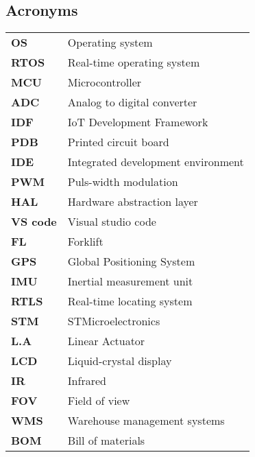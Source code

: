 \documentclass[../report.tex]{subfiles}
\begin{document}
\subsection{Acronyms}
\begin{table}[H]
    \begin{center}
        \begin{tabularx}{\linewidth}{l L}
            \textbf{OS} & Operating system\\
            \textbf{RTOS} & Real-time operating system\\
            \textbf{MCU} & Microcontroller\\
            \textbf{ADC} & Analog to digital converter\\
            \textbf{IDF} & IoT Development Framework\\
            \textbf{PDB} & Printed circuit board\\
            \textbf{IDE} & Integrated development environment\\
            \textbf{PWM} & Puls-width modulation \\
            \textbf{HAL} & Hardware abstraction layer\\
            \textbf{VS code} & Visual studio code\\
            \textbf{FL} & Forklift\\
            \textbf{GPS} & Global Positioning System\\
            \textbf{IMU} & Inertial measurement unit\\
            \textbf{RTLS} & Real-time locating system\\
            \textbf{STM} & STMicroelectronics\\
            \textbf{L.A} & Linear Actuator \\
            \textbf{LCD} &Liquid-crystal display \\
            \textbf{IR} & Infrared\\
            \textbf{FOV} & Field of view\\
            \textbf{WMS} & Warehouse management systems\\
            \textbf{BOM} & Bill of materials
        \end{tabularx}
    \end{center}
\end{table}
\end{document}
